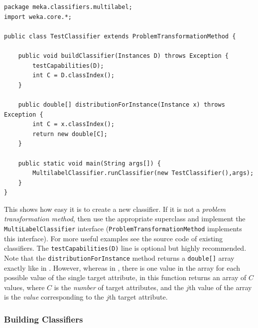 \documentclass[11pt]{article}
\newcommand{\MEKA}{Meka}
\newcommand{\WEKA}{Weka}
\begin{document}
{\small
\lstset{basicstyle=\small\ttfamily,breaklines=true,language=java,frame=L,xleftmargin=\parindent}
\begin{lstlisting}
package meka.classifiers.multilabel;
import weka.core.*;

public class TestClassifier extends ProblemTransformationMethod {
	
    public void buildClassifier(Instances D) throws Exception {
        testCapabilities(D);
        int C = D.classIndex();
    }
    
    public double[] distributionForInstance(Instance x) throws Exception {
        int C = x.classIndex();
       	return new double[C];
    }
    
    public static void main(String args[]) {
        MultilabelClassifier.runClassifier(new TestClassifier(),args);
    }
}
\end{lstlisting}
}

This shows how easy it is to create a new classifier. If it is not a \textit{problem transformation method},
then use the appropriate \framework{\WEKA} superclass and implement the \texttt{MultiLabelClassifier}
interface (\texttt{ProblemTransformationMethod} implements this interface).
For more useful examples see the source code of existing \framework{\MEKA} classifiers.
The \texttt{testCapabilities(D)} line is optional but highly recommended. Note that the \texttt{distributionForInstance}
method returns a \texttt{double[]} array exactly like in \framework{\WEKA}. However, whereas in \framework{\WEKA},
there is one value in the array for each possible value of the single target attribute, in \framework{\MEKA} this
function returns an array of $C$ values, where $C$ is the \emph{number} of target attributes, and the $j$th value of
the array is the \emph{value} corresponding to the $j$th target attribute.

\subsubsection{Building Classifiers}
\end{document}
